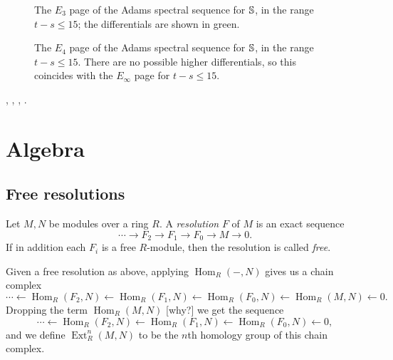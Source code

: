 \documentclass{MetricNotes2023}
\def\bb{\ensuremath\mathbb}
\DeclareMathOperator{\Ext}{Ext}
\DeclareMathOperator{\Hom}{Hom}
\DeclareMathOperator{\im}{im}
\begin{document}
\begin{figure}[H]
\centering

\caption{The \(E_3\) page of the Adams spectral sequence for \(\bb{S}\), in the range \(t-s\leq 15\); the differentials are shown in green.}
\end{figure}

\begin{figure}[H]
\centering

\caption{The \(E_4\) page of the Adams spectral sequence for \(\bb{S}\), in the range \(t-s\leq 15\). There are no possible higher differentials, so this coincides with the \(E_\infty\) page for \(t-s\leq 15\).}
\end{figure}

\autocite{stable_homotopy}, \autocite{cobordism}, \autocite{ass}, \autocite{rognes2}.

\appendix 

\section{Algebra}

\subsection{Free resolutions}\label{2502220958}

\begin{definition}
Let \(M, N\) be modules over a ring \(R\). A \textit{resolution} \(F\) of \(M\) is an exact sequence 
\[\cdots \to F_2 \to F_1 \to F_0 \to M \to 0.\]
If in addition each \(F_i\) is a free \(R\)-module, then the resolution is called \textit{free}. 
\end{definition}

Given a free resolution as above, applying \(\Hom_R(-, N)\) gives us a chain complex
\[\cdots \leftarrow \Hom_R(F_2, N) \leftarrow \Hom_R(F_1, N) \leftarrow \Hom_R(F_0, N) \leftarrow \Hom_R(M, N) \leftarrow 0.\]
Dropping the term \(\Hom_R(M, N)\) [why?] we get the sequence
\[\cdots \leftarrow \Hom_R(F_2, N) \leftarrow \Hom_R(F_1, N) \leftarrow \Hom_R(F_0, N) \leftarrow 0,\]
and we define \(\Ext^n_R(M, N)\) to be the \(n\)th homology group of this chain complex. 

\end{document}
